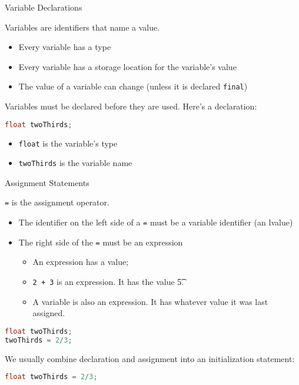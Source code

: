 \documentclass{beamer}
\begin{document}
\begin{frame}[fragile]{Variable Declarations}


Variables are identifiers that name a value.
\begin{itemize}
\item Every variable has a type
\item Every variable has a storage location for the variable's value
\item The value of a variable can change (unless it is declared {\tt final})
\end{itemize}

Variables must be declared before they are used.  Here's a declaration:
\begin{lstlisting}[language=Java]
float twoThirds;
\end{lstlisting}
\begin{itemize}
\item {\tt float} is the variable's type
\item {\tt twoThirds} is the variable name
\end{itemize}


\end{frame}

\begin{frame}[fragile]{Assignment Statements}


{\tt =} is the assignment operator.
\begin{itemize}
\item The identifier on the left side of a {\tt =} must be a variable identifier (an lvalue)
\item The right side of the {\tt =} must be an expression
\begin{itemize}
\item An expression has a value;
\item {\tt 2 + 3} is an expression.  It has the value {\t 5}.
\item A variable is also an expression.  It has whatever value it was last assigned.
\end{itemize}

\end{itemize}

\begin{lstlisting}[language=Java]
float twoThirds;
twoThirds = 2/3;
\end{lstlisting}
We usually combine declaration and assignment into an initialization statement:
\begin{lstlisting}[language=Java]
float twoThirds = 2/3;
\end{lstlisting}


\end{frame}
\end{document}
